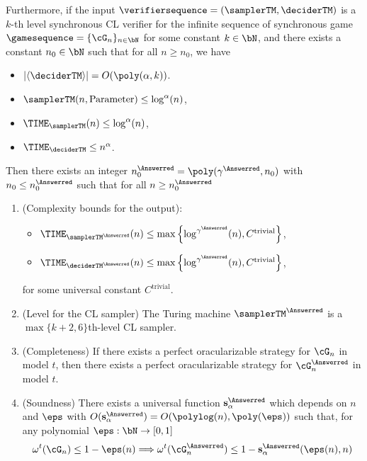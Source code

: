 \begin{proposition}
	Furthermore, if the input $\verifiersequence = (\samplerTM, \deciderTM)$ is a $k$-th level synchronous CL verifier for the infinite sequence of synchronous game $\gamesequence = \{\cG_n\}_{n \in \bN}$ for some constant $k \in \bN$, and there exists a constant $n_0 \in \bN$ such that for all $n \geq n_0$, we have
	\begin{itemize}
		\item  $|\langle\deciderTM\rangle| =  O(\poly( \alpha, k))$.
		\item  $\samplerTM(n, \text{Parameter}) \leq \log^{\alpha}(n)$,
		\item  $\TIME_{ \samplerTM }(n) \leq \log^{\alpha}(n)$,
		\item  $\TIME_{ \deciderTM} \leq n^{\alpha}$.
	\end{itemize}
	Then there exists an integer $n_0^{\Answerred} = \poly(\gamma^{\Answerred}, n_0)$ with $n_0 \leq n_0^{\Answerred}$ such that for all $n \geq n_0^{\Answerred}$
	\begin{enumerate}
		\item (Complexity bounds for the output): 
		\begin{itemize}
			\item  $\TIME_{ \samplerTM^{\Answerred} }(n) \leq \max\left\{\log^{\gamma^{\Answerred}}(n), C^{\text{trivial}}\right\}$,
			\item  $\TIME_{ \deciderTM^{\Answerred}}(n) \leq \max\left\{\log^{\gamma^{\Answerred}}(n), C^{\text{trivial}}\right\}$,
		\end{itemize}
		for some universal constant $C^{\text{trivial}}$. 
		\item (Level for the CL sampler) The Turing machine $\samplerTM^{\Answerred}$ is a $\max\{k+2, 6\}$th-level CL sampler.
		\item (Completeness) If there exists a perfect oracularizable strategy for $\cG_n$ in model $t$, then there exists a perfect oracularizable strategy for $\cG^{\Answerred}_n$ in model $t$. 
		\item (Soundness) There exists a universal function $\mathbf{s}^{\Answerred}_{\alpha}$ which depends on $n$ and $\eps$ with $O(\mathbf{s}^{\Answerred}_{\alpha}) = O(\polylog(n), \poly(\eps))$ such that, for any polynomial $\mathbf{\eps}: \bN \rightarrow [0,1]$ 
		\begin{equation} \label{eq:ARsoundnessclause}
			\omega^t(\cG_n) \leq 1 - \mathbf{\eps}(n) \Longrightarrow \omega^t(\cG^{\Answerred}_n) \leq 1 -\mathbf{s}^{\Answerred}_{\alpha}(\mathbf{\eps}(n), n)
		\end{equation}
	\end{enumerate}
\end{proposition}

